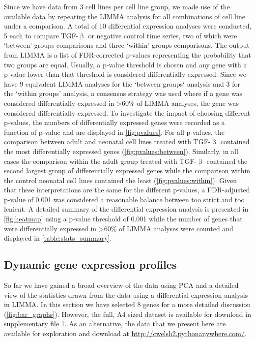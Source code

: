 \documentclass[alpha-refs]{wiley-article}
\newcommand{\tgf}{TGF-$\upbeta$}
\begin{document}
Since we have data from 3 cell lines per cell line group, we made use of the available data by repeating the LIMMA analysis for all combinations of cell line under a comparison. A total of 10 differential expression analyses were conducted, 5 each to compare \tgf{} or negative control time series, two of which were `between' groups comparisons and three `within' groups comparisons. The output from LIMMA is a list of FDR-corrected p-values representing the probability that two groups are equal. Usually, a p-value threshold is chosen and any gene with a p-value lower than that threshold is considered differentially expressed. Since we have 9 equivalent LIMMA analyses for the `between groups` analysis and 3 for the `within groups' analysis, a consensus strategy was used where if a gene was considered differentially expressed in >60\% of LIMMA analyses, the gene was considered differentially expressed. To investigate the impact of choosing different p-values, the numbers of differentially expressed genes were recorded as a function of p-value and are displayed in \cref{fig:pvalues}. For all p-values, the comparison between adult and neonatal cell lines treated with \tgf{} contained the most differentially expressed genes (\cref{fig:pvalues:between}). Similarly, in all cases the comparison within the adult group treated with \tgf{} contained the second largest group of differentially expressed genes while the comparison within the control neonatal cell lines contained the least (\cref{fig:pvalues:within}). Given that these interpretations are the same for the different p-values, a FDR-adjusted p-value of 0.001 was considered a reasonable balance between too strict and too lenient. A detailed summary of the differential expression analysis is presented in \cref{fig:heatmap} using a p-value threshold of 0.001 while the number of genes that were differentially expressed in >60\% of LIMMA analyses were counted and displayed in \cref{table:stats_summary}.

\subsection{Dynamic gene expression profiles}
So far we have gained a broad overview of the data using PCA and a detailed view of the statistics drawn from the data using a differential expression analysis in LIMMA. In this section we have selected 8 genes for a more detailed discussion (\cref{fig:bar_graphs}). However, the full, A4 sized dataset is available for download in supplementary file 1. As an alternative, the data that we present here are available for exploration and download at \url{http://cwelsh2.pythonanywhere.com/}. 
\end{document}

